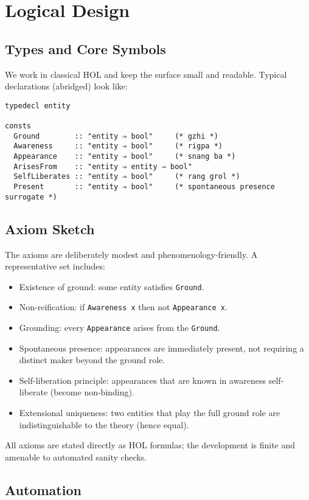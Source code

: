 \documentclass[11pt,a4paper]{article}
\begin{document}
\section{Logical Design}

\subsection{Types and Core Symbols}

We work in classical HOL and keep the surface small and readable. Typical
declarations (abridged) look like:
\begin{lstlisting}
typedecl entity

consts
  Ground        :: "entity ⇒ bool"     (* gzhi *)
  Awareness     :: "entity ⇒ bool"     (* rigpa *)
  Appearance    :: "entity ⇒ bool"     (* snang ba *)
  ArisesFrom    :: "entity ⇒ entity ⇒ bool"
  SelfLiberates :: "entity ⇒ bool"     (* rang grol *)
  Present       :: "entity ⇒ bool"     (* spontaneous presence surrogate *)
\end{lstlisting}

\subsection{Axiom Sketch}

The axioms are deliberately modest and phenomenology-friendly. A representative
set includes:
\begin{itemize}
  \item Existence of ground: some entity satisfies \texttt{Ground}.
  \item Non-reification: if \texttt{Awareness x} then not \texttt{Appearance x}.
  \item Grounding: every \texttt{Appearance} arises from the \texttt{Ground}.
  \item Spontaneous presence: appearances are immediately present, not requiring
        a distinct maker beyond the ground role.
  \item Self-liberation principle: appearances that are known in awareness
        self-liberate (become non-binding).
  \item Extensional uniqueness: two entities that play the full ground role are
        indistinguishable to the theory (hence equal).
\end{itemize}
All axioms are stated directly as HOL formulas; the development is finite and
amenable to automated sanity checks.

\subsection{Automation}
\end{document}
